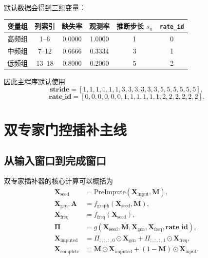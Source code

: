 \documentclass[UTF8]{ctexart}
\newcommand{\code}[1]{\texttt{#1}}
\begin{document}
默认数据会得到三组变量：

\begin{center}
\small
\begin{tabular}{cccccc}
\toprule
变量组 & 列索引 & 缺失率 & 观测率 & 推断步长 \(s_n\) & \code{rate\_id} \\
\midrule
高频组 & 1--6 & 0.0000 & 1.0000 & 1 & 0 \\
中频组 & 7--12 & 0.6666 & 0.3334 & 3 & 1 \\
低频组 & 13--18 & 0.8000 & 0.2000 & 5 & 2 \\
\bottomrule
\end{tabular}
\end{center}

因此主程序默认使用
\begin{equation}
    \bm{stride} = [1,1,1,1,1,1,3,3,3,3,3,3,5,5,5,5,5,5],
\end{equation}
\begin{equation}
    \bm{rate\_id} = [0,0,0,0,0,0,1,1,1,1,1,1,2,2,2,2,2,2].
\end{equation}

\section{双专家门控插补主线}

\subsection{从输入窗口到完成窗口}

双专家插补器的核心计算可以概括为
\begin{equation}
    \begin{aligned}
        \bm{X}_{\text{seed}} &= \text{PreImpute}(\bm{X}_{\text{input}}, \bm{M}), \\
        \bm{X}_{\text{gcn}}, \bm{A} &= f_{\text{graph}}(\bm{X}_{\text{seed}}, \bm{M}), \\
        \bm{X}_{\text{freq}} &= f_{\text{freq}}(\bm{X}_{\text{seed}}), \\
        \bm{\Pi} &= g(\bm{X}_{\text{seed}}, \bm{M}, \bm{X}_{\text{gcn}}, \bm{X}_{\text{freq}}, \bm{rate\_id}), \\
        \bm{X}_{\text{imputed}} &= \Pi_{:,:,:,0} \odot \bm{X}_{\text{gcn}} + \Pi_{:,:,:,1} \odot \bm{X}_{\text{freq}}, \\
        \bm{X}_{\text{complete}} &= \bm{M} \odot \bm{X}_{\text{imputed}} + (1-\bm{M}) \odot \bm{X}_{\text{input}}.
    \end{aligned}
\end{equation}
\end{document}
